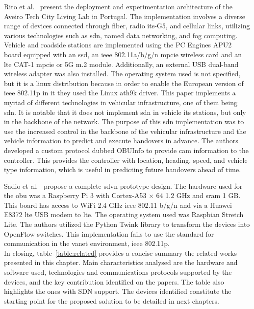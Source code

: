 Rito et al.~\cite{rito_aveiro_2023} present the deployment and experimentation architecture of the Aveiro Tech City Living Lab in Portugal. The implementation involves a diverse range of devices connected through fiber, radio \gls{its}-G5, and cellular links, utilizing various technologies such as \gls{sdn}, named data networking, and fog computing.
Vehicle and roadside stations are implemented using the PC Engines APU2 board equipped with an \gls{ssd}, an \gls{ieee} 802.11a/b/g/n \gls{mpcie} wireless card and an \gls{lte} CAT-1 \gls{mpcie} or 5G m.2 module. Additionally, an external USB dual-band wireless adapter was also installed. The operating system used is not specified, but it is a linux distribution because in order to enable the European version of \gls{ieee} 802.11p in it they used the Linux ath9k driver.
This paper implements a myriad of different technologies in vehicular infrastructure, one of them being \gls{sdn}. It is notable that it does not implement \gls{sdn} in vehicle \gls{its} stations, but only in the backbone of the network. The purpose of this \gls{sdn} implementation was to use the increased control in the backbone of the vehicular infrastructure and the vehicle information to predict and execute handovers in advance. The authors developed a custom protocol dubbed OBUInfo to provide \gls{cam} information to the controller. This provides the controller with location, heading, speed, and vehicle type information, which is useful in predicting future handovers ahead of time.


Sadio et al.~\cite{sadio_design_2020} propose a complete \gls{sdvn} prototype design. The hardware used for the \gls{obu} was a Raspberry Pi 3 with Cortex-A53 × 64 1.2 GHz and \gls{sram} 1 GB. This board has access to WiFi 2.4 GHz \gls{ieee} 802.11 b/g/n and via a Huawei E8372 \gls{lte} USB modem to \gls{lte}. The operating system used was Raspbian Stretch Lite. The authors utilized the Python Twink library to transform the devices into OpenFlow switches. This implementation fails to use the standard for communication in the \gls{vanet} environment, \gls{ieee} 802.11p.
\\
In closing, table~\ref{table:related} provides a concise summary the related works presented in this chapter. Main characteristics analysed are the hardware and software used, technologies and communications protocols supported by the devices, and the key contribution identified on the papers. The table also highlights the ones with SDN support. The devices identified constitute the starting point for the proposed solution to be detailed in next chapters.


